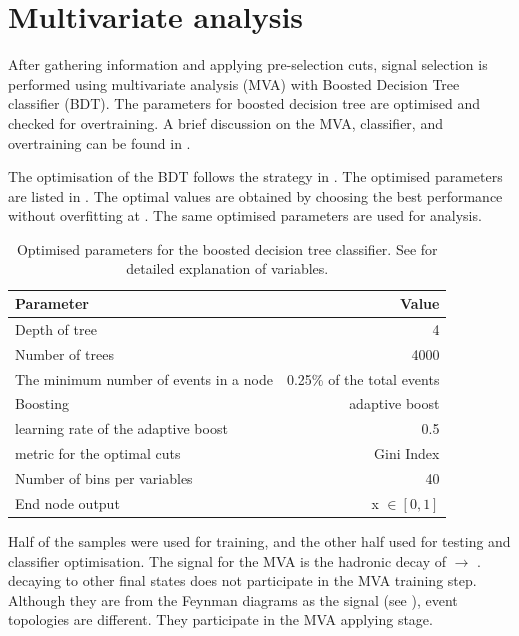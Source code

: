 \section{Multivariate analysis}
\label{sec:doubleHiggsMVA}
After gathering information and applying  pre-selection cuts, signal selection is performed using  multivariate analysis (MVA) with Boosted Decision Tree classifier (BDT). The parameters for boosted decision tree are optimised and checked for overtraining. A brief discussion on the MVA, classifier, and overtraining  can be found in \Section{}.

The optimisation of the BDT follows the strategy in \Section{}. The optimised parameters are listed in .  The optimal values are obtained by choosing the best performance without overfitting at . The same optimised parameters are used for  analysis.

\begin{table}[!tbp]\centering
\small
\begin{tabular}{lr}
\hline \hline
 Parameter &  Value \\
\hline
Depth of tree & 4 \\
Number of trees & 4000 \\
The minimum number of events in a node &  0.25\% of the total events \\
Boosting & adaptive boost \\
learning rate of the adaptive boost & 0.5 \\
metric for the optimal cuts & Gini Index \\
Number of bins per variables & 40 \\
End node output & x $\in [0,1]$ \\
\hline \hline
\end{tabular}

\caption
{Optimised parameters for the boosted decision tree classifier. See \Section{} for detailed explanation of variables.}
\label{tab:doubleHiggsBDTparameters}
\end{table}

Half of the samples were used for training, and the other half used for testing and classifier optimisation. The signal for the MVA is the hadronic decay of \eeToHH $\to$ \HepProcess{ \Pbottom \APbottom \PWplus \PWminus \Pnue \APnue}. \eeToHH decaying to other final states does not participate in the MVA training step. Although they are from the Feynman diagrams as the signal (see ), event topologies are different.  They participate in the MVA applying stage.

